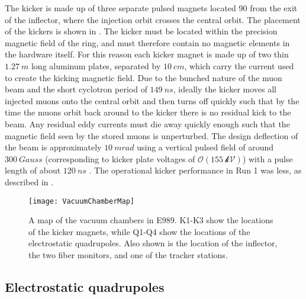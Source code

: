 The kicker is made up of three separate pulsed magnets located 90\textdegree{} from the exit of the inflector, where the injection orbit crosses the central orbit. The placement of the kickers is shown in . The kicker must be located within the precision magnetic field of the ring, and must therefore contain no magnetic elements in the hardware itself. For this reason each kicker magnet is made up of two thin $\SI{1.27}{m}$ long aluminum plates, separated by $\SI{10}{cm}$, which carry the current used to create the kicking magnetic field. Due to the bunched nature of the muon beam and the short cyclotron period of $\SI{149}{ns}$, ideally the kicker moves all injected muons onto the central orbit and then turns off quickly such that by the time the muons orbit back around to the kicker there is no residual kick to the beam. Any residual eddy currents must die away quickly enough such that the magnetic field seen by the stored muons is unperturbed. The design deflection of the beam is approximately $\SI{10}{mrad}$ using a vertical pulsed field of around $\SI{300}{Gauss}$ (corresponding to kicker plate voltages of $\mathcal{O(\SI{155}{kV})}$) with a pulse length of about $\SI{120}{ns}$ \cite{TDR}. The operational kicker performance in Run 1 was less, as described in .



\begin{figure}[]
    \centering
    \texttt{[image: VacuumChamberMap]}
    \caption[Vacuum chamber map]{A map of the vacuum chambers in E989. K1-K3 show the locations of the kicker magnets, while Q1-Q4 show the locations of the electrostatic quadrupoles. Also shown is the location of the inflector, the two fiber monitors, and one of the tracker stations.}   
    \label{fig:vacmap}
\end{figure}

\subsection{Electrostatic quadrupoles}
\label{sub:quads}

